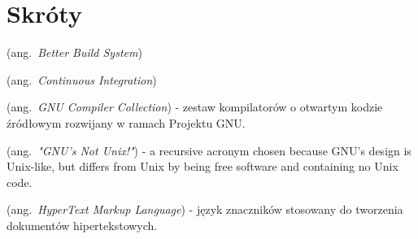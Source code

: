 % 
\chapter*{Skróty}
\label{sec:skroty}
\noindent\vspace{-\topsep-\partopsep-\parsep} %
\begin{description}[labelwidth=*]
  \item [BBS] (ang.\ \emph{Better Build System})
  \item [CI] (ang.\ \emph{Continuous Integration})
  \item [GCC] (ang.\ \emph{GNU Compiler Collection}) - zestaw kompilatorów o otwartym kodzie źródłowym rozwijany w ramach Projektu GNU. 
  \item [GNU] (ang.\ \emph{"GNU's Not Unix!"}) - a recursive acronym chosen because GNU's design is Unix-like, but differs from Unix by being free software and containing no Unix code.
  \item [HTML] (ang.\ \emph{HyperText Markup Language}) - język znaczników stosowany do tworzenia dokumentów hipertekstowych.
\end{description}
